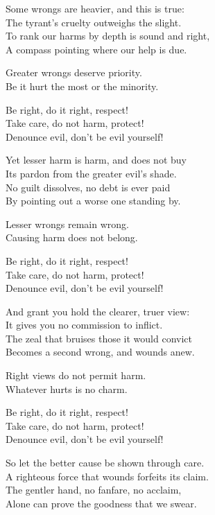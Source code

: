 \begin{lyrics}
Some wrongs are heavier, and this is true:\\
The tyrant’s cruelty outweighs the slight.\\
To rank our harms by depth is sound and right,\\
A compass pointing where our help is due.

Greater wrongs deserve priority.\\
Be it hurt the most or the minority.

Be right, do it right, respect!\\
Take care, do not harm, protect!\\
Denounce evil, don't be evil yourself!

Yet lesser harm is harm, and does not buy\\
Its pardon from the greater evil’s shade.\\
No guilt dissolves, no debt is ever paid\\
By pointing out a worse one standing by.

Lesser wrongs remain wrong.\\
Causing harm does not belong.

Be right, do it right, respect!\\
Take care, do not harm, protect!\\
Denounce evil, don't be evil yourself!

And grant you hold the clearer, truer view:\\
It gives you no commission to inflict.\\
The zeal that bruises those it would convict\\
Becomes a second wrong, and wounds anew.

Right views do not permit harm.\\
Whatever hurts is no charm.

Be right, do it right, respect!\\
Take care, do not harm, protect!\\
Denounce evil, don't be evil yourself!

So let the better cause be shown through care.\\
A righteous force that wounds forfeits its claim.\\
The gentler hand, no fanfare, no acclaim,\\
Alone can prove the goodness that we swear.


\end{lyrics}
